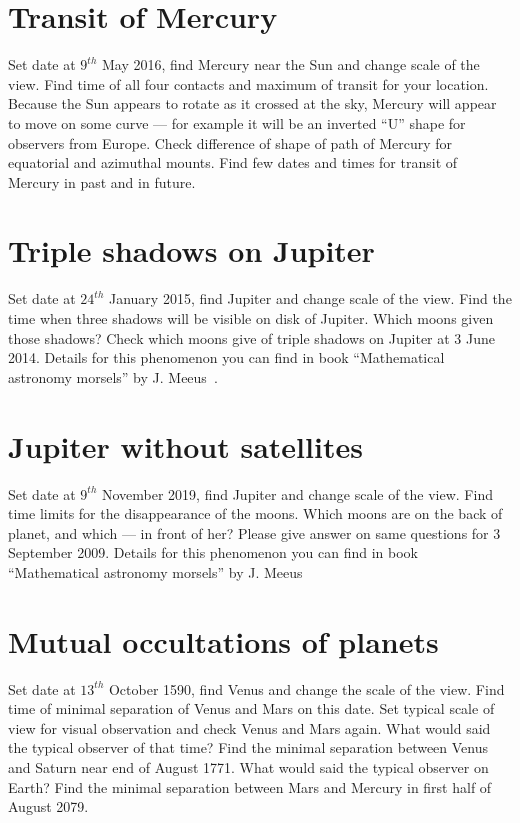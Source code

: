 \section{Transit of Mercury}
\label{sec:Exercises:TransitOfMercury}

Set date at $9^{th}$ May 2016, find Mercury near the Sun and 
change scale of the view. Find time of all four contacts and 
maximum of transit for your location. Because the Sun appears 
to rotate as it crossed at the sky, Mercury will appear to move 
on some curve --- for example it will be an inverted ``U'' shape 
for observers from Europe. Check difference of shape of path of 
Mercury for equatorial and azimuthal mounts. Find few dates and 
times for transit of Mercury in past and in future.

\section{Triple shadows on Jupiter}
\label{sec:Exercises:TripleShadowsOnJupiter}

Set date at $24^{th}$ January 2015, find Jupiter and change 
scale of the view. Find the time when three shadows will be 
visible on disk of Jupiter. Which moons given those shadows? 
Check which moons give of triple shadows on Jupiter at 3 
June 2014. Details for this phenomenon you can find in book 
``Mathematical astronomy morsels'' by J. Meeus~\cite{MeeusAstMorsels}.

\section{Jupiter without satellites}
\label{sec:Exercises:JupiterWithoutSatellites}

Set date at $9^{th}$ November 2019, find Jupiter and change 
scale of the view. Find time limits for the disappearance 
of the moons. Which moons are on the back of planet, and 
which --- in front of her? Please give answer on same 
questions for 3 September 2009. Details for this phenomenon 
you can find in book ``Mathematical astronomy morsels'' by 
J. Meeus~\cite{MeeusAstMorsels}

\section{Mutual occultations of planets}
\label{sec:Exercises:MutualOccultationsOfPlanets}

Set date at $13^{th}$ October 1590, find Venus and change 
the scale of the view. Find time of minimal separation of 
Venus and Mars on this date. Set typical scale of view 
for visual observation and check Venus and Mars again. 
What would said the typical observer of that time? Find 
the minimal separation between Venus and Saturn near end 
of August 1771. What would said the typical observer on 
Earth? Find the minimal separation between Mars and 
Mercury in first half of August 2079. 

